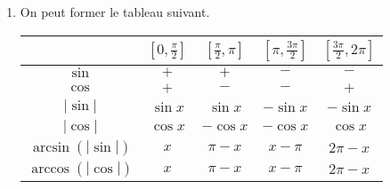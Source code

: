 \begin{enumerate}
\item On peut former le tableau suivant.
\begin{center}
\begin{tabular}{|c|c|c|c|c|}
\hline
& $\left[ 0,\frac{\pi }{2}\right] $ & $\left[ \frac{\pi }{2},\pi \right] $ &
$\left[ \pi ,\frac{3\pi }{2}\right] $ & $\left[ \frac{3\pi }{2},2\pi \right]
$ \\ \hline
$\sin $ & $+$ & $+$ & $-$ & $-$ \\ \hline
$\cos $ & $+$ & $-$ & $-$ & $+$ \\ \hline
$\left| \sin \right| $ & $\sin x$ & $\sin x$ & $-\sin x$ & $-\sin x$ \\
\hline
$\left| \cos \right| $ & $\cos x$ & $-\cos x$ & $-\cos x$ & $\cos x$ \\
\hline
$\arcsin (\left| \sin \right| )$ & $x$ & $\pi -x$ & $x-\pi $ & $2\pi -x$ \\
\hline
$\arccos (\left| \cos \right| )$ & $x$ & $\pi -x$ & $x-\pi $ & $2\pi -x$ \\
\hline
\end{tabular}
\end{center}
\end{enumerate}
